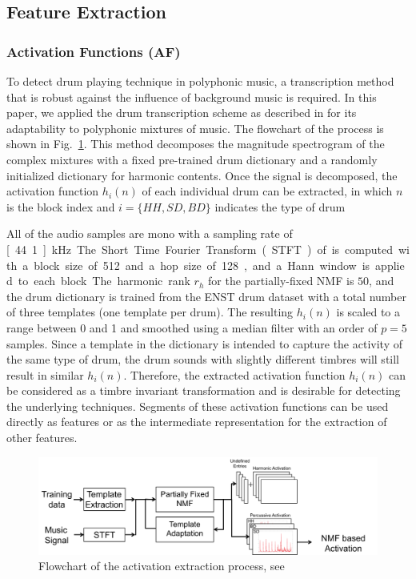\documentclass{article}
\begin{document}
\subsection{Feature Extraction}\label{ssec:featuresExtract}
\subsubsection{Activation Functions (AF)}
\label{sssec:activ}

To detect drum playing technique in polyphonic music, a transcription method that is robust against the influence of background music is required. In this paper, we applied the drum transcription scheme as described in \cite{Wu2015a} for its adaptability to polyphonic mixtures of music. The flowchart of the process is shown in Fig.~\ref{fig:nmf}. This method decomposes the magnitude spectrogram of the complex mixtures with a fixed pre-trained drum dictionary and a randomly initialized dictionary for harmonic contents. Once the signal is decomposed, the activation function $h_{i}(n)$ of each individual drum can be extracted, in which $n$ is the block index and $i = \{HH, SD, BD\}$ indicates the type of drum

All of the audio samples are mono with a sampling rate of \unit[44.1]{kHz}. The Short Time Fourier Transform (STFT) of is computed with a block size of 512 and a hop size of 128, and a Hann window is applied to each block. The harmonic rank $r_{h} $ for the partially-fixed NMF is  $50$, and the drum dictionary is trained from the ENST drum dataset \cite{Gillet2006} with a total number of three templates (one template per drum). The resulting $h_{i}(n)$ is scaled to a range between 0 and 1 and smoothed using a median filter with an order of $p = 5$ samples. Since a template in the dictionary is intended to capture the activity of the same type of drum, the drum sounds with slightly different timbres will still result in similar $h_{i}(n)$. Therefore, the extracted activation function $h_{i}(n)$ can be considered as a timbre invariant transformation and is desirable for detecting the underlying techniques. Segments of these activation functions can be used directly as features or as the intermediate representation for the extraction of other features. 

\begin{figure}
\centering
\includegraphics[width = 8.5 cm]{./figures/nmf.png}
\caption{Flowchart of the activation extraction process, see \cite{Wu2015a}}
\label{fig:nmf}
\end{figure}
\end{document}
